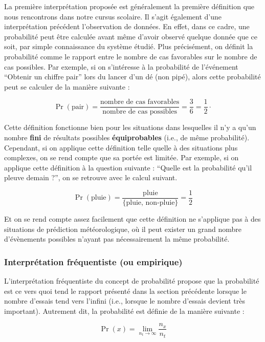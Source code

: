 \documentclass[
  a4paper,11pt,twoside,onecolumn,openright,final,oldfontcommands]{memoir}
\theoremstyle{definition}
\theoremstyle{definition}
\theoremstyle{definition}
\theoremstyle{definition}
\theoremstyle{remark}
\begin{document}
La première interprétation proposée est généralement la première définition que nous rencontrons dans notre cursus scolaire. Il s'agit également d'une interprétation précédent l'observation de données. En effet, dans ce cadre, une probabilité peut être calculée avant même d'avoir observé quelque donnée que ce soit, par simple connaissance du système étudié. Plus précisément, on définit la probabilité comme le rapport entre le nombre de cas favorables sur le nombre de cas possibles. Par exemple, si on s'intéresse à la probabilité de l'événement ``Obtenir un chiffre pair'' lors du lancer d'un dé (non pipé), alors cette probabilité peut se calculer de la manière suivante :

\[
\Pr(\text{pair}) = \frac{\text{nombre de cas favorables}}{\text{nombre de cas possibles}} = \frac{3}{6} = \frac{1}{2} \cdot
\]

Cette définition fonctionne bien pour les situations dans lesquelles il n'y a qu'un nombre \textbf{fini} de résultats possibles \textbf{équiprobables} (i.e., de même probabilité). Cependant, si on applique cette définition telle quelle à des situations plus complexes, on se rend compte que sa portée est limitée. Par exemple, si on applique cette définition à la question suivante : ``Quelle est la probabilité qu'il pleuve demain ?'', on se retrouve avec le calcul suivant.

\[
\Pr(\text{pluie}) = \frac{\text{pluie}}{ \{\text{pluie, non-pluie} \} } = \frac{1}{2}
\]

Et on se rend compte assez facilement que cette définition ne s'applique pas à des situations de prédiction météorologique, où il peut exister un grand nombre d'évènements possibles n'ayant pas nécessairement la même probabilité.

\hypertarget{interpruxe9tation-fruxe9quentiste-ou-empirique}{%
\subsubsection{Interprétation fréquentiste (ou empirique)}\label{interpruxe9tation-fruxe9quentiste-ou-empirique}}

L'interprétation fréquentiste du concept de probabilité propose que la probabilité est ce vers quoi tend le rapport présenté dans la section précédente lorsque le nombre d'essais tend vers l'infini (i.e., lorsque le nombre d'essais devient très important). Autrement dit, la probabilité est définie de la manière suivante :

\[\Pr(x) = \lim_{n_{t} \to \infty}\frac{n_{x}}{n_{t}}\]
\end{document}

